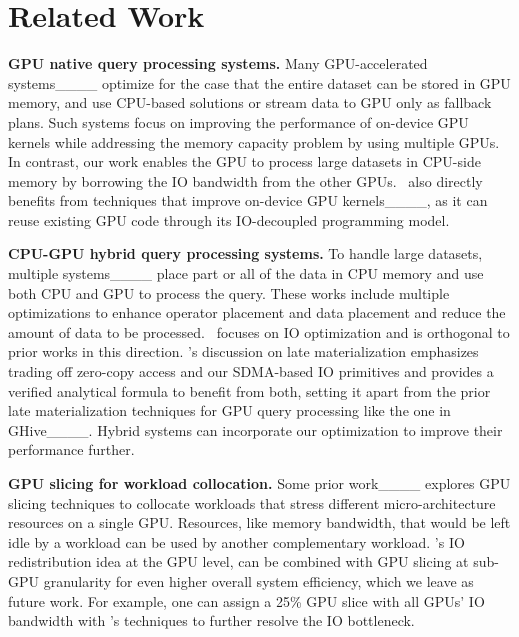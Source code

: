 \section{Related Work}
\label{section:related_works}

\textbf{GPU native query processing systems.}
Many GPU-accelerated systems____ optimize for the case that the entire dataset can be stored in GPU memory, and use CPU-based solutions or stream data to GPU only as fallback plans. 
Such systems focus on improving the performance of on-device GPU kernels while addressing the memory capacity problem by using multiple GPUs.
In contrast, our work enables the GPU to process large datasets in CPU-side memory by borrowing the IO bandwidth from the other GPUs.
\THISWORK\ also directly benefits from techniques that improve on-device GPU kernels____, as it can reuse existing GPU code through its IO-decoupled programming model.



\noindent
\textbf{CPU-GPU hybrid query processing systems.}
To handle large datasets, multiple systems____ place part or all of the data in CPU memory and use both CPU and GPU to process the query. 
These works include multiple optimizations to enhance operator placement and data placement and reduce the amount of data to be processed.
\THISWORK\ focuses on IO optimization and is orthogonal to prior works in this direction.
\THISWORK's discussion on late materialization emphasizes trading off zero-copy access and our SDMA-based IO primitives and provides a verified analytical formula to benefit from both, setting it apart from the prior late materialization techniques for GPU query processing like the one in GHive____.
Hybrid systems can incorporate our optimization to improve their performance further.

\noindent
\textbf{GPU slicing for workload collocation.}
Some prior work____ explores GPU slicing techniques to collocate workloads that stress different micro-architecture resources on a single GPU.
Resources, like memory bandwidth, that would be left idle by a workload can be used by another complementary workload. 
\THISWORK's IO redistribution idea at the GPU level, can be combined with GPU slicing at sub-GPU granularity for even higher overall system efficiency, which we leave as future work.
For example, one can assign a 25\% GPU slice with all GPUs' IO bandwidth with \THISWORK's techniques to further resolve the IO bottleneck.



%